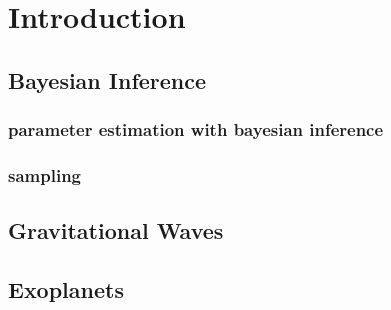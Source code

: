 \chapter{Introduction}
\label{cp.intro}




\section{Bayesian Inference}

\subsection{parameter estimation with bayesian inference}

\subsection{sampling}


\section{Gravitational Waves}

\section{Exoplanets}